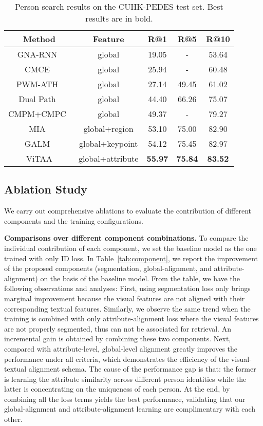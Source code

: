 \documentclass[runningheads]{llncs}
\begin{document}
\begin{table}[t]
\caption{Person search results on the CUHK-PEDES test set. Best results are in bold.}
\begin{center}
\setlength{\tabcolsep}{7.5pt}
\begin{tabular}{c|c|ccc}
\toprule[1pt]
Method &Feature &R@1 &R@5 &R@10 \\
\hline
GNA-RNN~\cite{li2017person} &global &19.05 &- &53.64 \\
CMCE~\cite{li2017identity} &global &25.94 &- &60.48 \\
PWM-ATH~\cite{8354312} &global &27.14 &49.45 &61.02 \\
Dual Path~\cite{zheng2017dual} &global &44.40 &66.26 &75.07 \\
CMPM+CMPC~\cite{zhang2018deep} &global &49.37 &- &79.27 \\
MIA~\cite{niu2019improving} &global+region &53.10 &75.00 &82.90 \\
GALM~\cite{jing2018pose} &global+keypoint &54.12 &75.45 &82.97 \\
\hline
ViTAA &global+attribute &\textbf{55.97} &\textbf{75.84} &\textbf{83.52} \\
\bottomrule[1pt]
\end{tabular}
\end{center}
\label{tab:bylanguage}
\end{table}

\subsection{Ablation Study}
We carry out comprehensive ablations to evaluate the contribution of different components and the training configurations.

\noindent\textbf{Comparisons over different component combinations.}
To compare the individual contribution of each component, we set the baseline model as the one trained with only ID loss. In Table~\ref{tab:component}, we report the improvement of the proposed components (segmentation, global-alignment, and attribute-alignment) on the basis of the baseline model.
From the table, we have the following observations and analyses: First, using segmentation loss only brings marginal improvement because the visual features are not aligned with their corresponding textual features.
Similarly, we observe the same trend when the training is combined with only attribute-alignment loss where the visual features are not properly segmented, thus can not be associated for retrieval. 
An incremental gain is obtained by combining these two components.
Next, compared with attribute-level, global-level alignment greatly improves the performance under all criteria, which demonstrates the efficiency of the visual-textual alignment schema.
The cause of the performance gap is that: the former is learning the attribute similarity across different person identities while the latter is concentrating on the uniqueness of each person.
At the end, by combining all the loss terms yields the best performance, validating that our global-alignment and attribute-alignment learning are complimentary with each other. 
\end{document}
